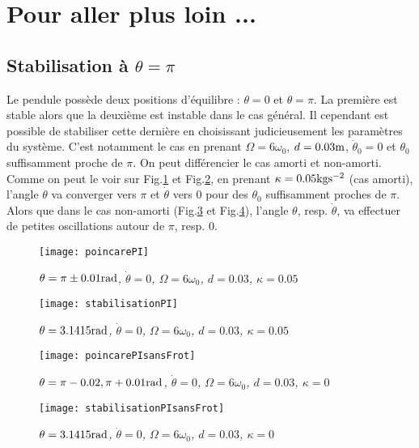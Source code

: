 \documentclass[a4paper,12pt,oneside]{article}
\def \t {\theta}
\def \vt {\Dot{\theta}}
\begin{document}
\newpage \section{Pour aller plus loin ...}
\subsection{Stabilisation à $\t=\pi$}
Le pendule possède deux positions d'équilibre : $\t=0$ et $\t=\pi$. La première est stable alors que la deuxième est instable dans le cas général. Il cependant est possible de stabiliser cette dernière en choisissant judicieusement les paramètres du système. C'est notamment le cas en prenant $\Omega=6\omega_0$, $d=0.03 \rm{m}$, $\vt_0=0$ et $\t_0$ suffisamment proche de $\pi$. On peut différencier le cas amorti et non-amorti. Comme on peut le voir sur Fig.\ref{poincarePI} et Fig.\ref{stabilisationPI}, en prenant $\kappa=0.05\rm{kgs^{-2}}$ (cas amorti), l'angle $\t$ va converger vers $\pi$ et $\vt$ vers $0$ pour des $\t_0$ suffisamment proches de $\pi$. Alors que dans le cas non-amorti (Fig.\ref{poincarePIsansFrot} et Fig.\ref{stabilisationPIsansFrot}), l'angle $\t$, resp. $\vt$, va effectuer de petites oscillations autour de $\pi$, resp. $0$.
\vspace{2cm}
\begin{figure}[H]
    \centerline{\texttt{[image: poincarePI]}}
\caption{ \label{poincarePI}\em
$\t=\pi \pm 0.01 \rm{rad}$, $\vt=0$, $\Omega = 6 \omega_0$, $d=0.03$, $\kappa=0.05$
}
\end{figure}

\begin{figure}[H]
    \centerline{\texttt{[image: stabilisationPI]}}
\caption{ \label{stabilisationPI}\em
$\t=3.1415 \rm{rad}$, $\vt=0$, $\Omega = 6 \omega_0$, $d=0.03$, $\kappa=0.05$
}
\end{figure}
\begin{figure}[H]
    \centerline{\texttt{[image: poincarePIsansFrot]}}
\caption{ \label{poincarePIsansFrot}\em
$\t=\pi-0.02, \pi+0.01 \rm{rad}$, $\vt=0$, $\Omega = 6 \omega_0$, $d=0.03$, $\kappa=0$
}
\end{figure}
\begin{figure}[H]
    \centerline{\texttt{[image: stabilisationPIsansFrot]}}
\caption{ \label{stabilisationPIsansFrot}\em
$\t=3.1415 \rm{rad}$, $\vt=0$, $\Omega = 6 \omega_0$, $d=0.03$, $\kappa=0$
}
\end{figure}
\end{document}
